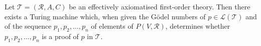 Let $\mathcal{T} = (\mathcal{R}, A, C)$ be an effectively axiomatised first-order theory. Then there exists a Turing machine which, when given the Gödel numbers of $p \in \mathcal{L}(\mathcal{T})$ and of the sequence $p_1, p_2, \ldots, p_n$ of elements of $P(V, \mathcal{R})$, determines whether $p_1, p_2, \ldots, p_n$ is a proof of $p$ in $\mathcal{T}$.
